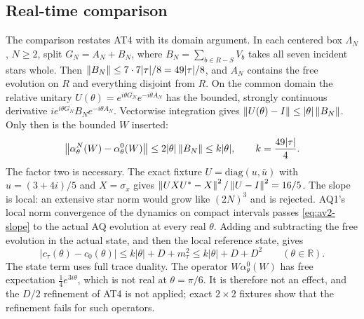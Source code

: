 \subsection{Real-time comparison}
\label{sec:av2-duhamel}
The comparison restates AT4 with its domain argument. In each centered box
$\Lambda_N$, $N\ge2$, split $G_N=A_N+B_N$, where $B_N=\sum_{b\in R-S}V_b$
takes all seven incident stars whole. Then
$\left\lVert B_N\right\rVert\le7\cdot7|\tau|/8=49|\tau|/8$, and $A_N$ contains the free
evolution on $R$ and everything disjoint from $R$. On the common domain the
relative unitary $U(\theta)=e^{i\theta G_N}e^{-i\theta A_N}$ has the bounded,
strongly continuous derivative $ie^{i\theta G_N}B_Ne^{-i\theta A_N}$.
Vectorwise integration gives $\left\lVert U(\theta)-I\right\rVert\le|\theta|\left\lVert B_N\right\rVert$. Only
then is the bounded $W$ inserted:
\begin{equation}
 \left\lVert\alpha^N_\theta(W)-\alpha^0_\theta(W)\right\rVert\le2|\theta|\left\lVert B_N\right\rVert\le k|\theta|,
 \qquad k=\frac{49|\tau|}{4}.
 \label{eq:av2-slope}
\end{equation}
The factor two is necessary. The exact fixture $U=\mathrm{diag}(u,\bar u)$
with $u=(3+4i)/5$ and $X=\sigma_x$ gives
$\left\lVert UXU^*-X\right\rVert^2/\left\lVert U-I\right\rVert^2=16/5$. The slope is local: an extensive star
norm would grow like $(2N)^3$ and is rejected. AQ1's local norm convergence of
the dynamics on compact intervals passes \eqref{eq:av2-slope} to the actual AQ
evolution at every real $\theta$. Adding and subtracting the free evolution in
the actual state, and then the local reference state, gives
\begin{equation}
 |c_\tau(\theta)-c_0(\theta)|
 \le k|\theta|+D+m_\tau^2\le k|\theta|+D+D^2\qquad(\theta\in\mathbb R).
 \label{eq:av2-compare}
\end{equation}
The state term uses full trace duality. The operator $W\alpha^0_\theta(W)$
has free expectation $\tfrac14e^{3i\theta}$, which is not real at
$\theta=\pi/6$. It is therefore not an effect, and the $D/2$ refinement of
AT4 is not applied; exact $2\times2$ fixtures show that the refinement fails
for such operators.


